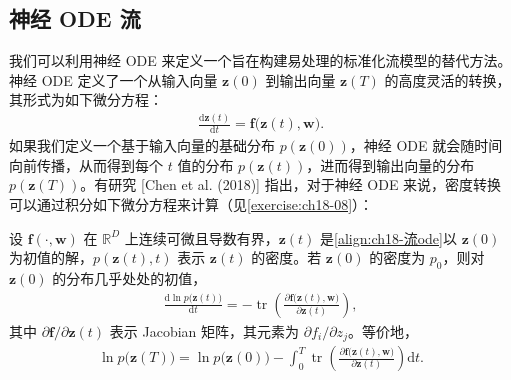\documentclass[../../main.tex]{subfiles}
\begin{document}
\subsection{神经 ODE 流}\label{subsection:ch18-神经ode流}

我们可以利用神经 ODE 来定义一个旨在构建易处理的标准化流模型的替代方法。神经 ODE 定义了一个从输入向量 $\bm{z}(0)$ 到输出向量 $\bm{z}(T)$ 的高度灵活的转换，其形式为如下微分方程：
\begin{align}
  \frac{\mathrm{d}\bm{z}(t)}{\mathrm{d}t}=\bm{f}\big(\bm{z}(t),\bm{w}\big).\label{align:ch18-流ode}
\end{align}
如果我们定义一个基于输入向量的基础分布 $p(\bm{z}(0))$，神经 ODE 就会随时间向前传播，从而得到每个 $t$ 值的分布 $p(\bm{z}(t))$，进而得到输出向量的分布 $p(\bm{z}(T))$。有研究 [Chen et al. (2018)] 指出，对于神经 ODE 来说，密度转换可以通过积分如下微分方程来计算（见\cref{exercise:ch18-08}）：

\begin{theorem}[连续流的瞬时变量替换]\label{theorem:ch18-瞬时变量替换}
设 $\bm{f}(\cdot,\bm{w})$ 在 $\mathbb{R}^{D}$ 上连续可微且导数有界，$\bm{z}(t)$ 是\eqref{align:ch18-流ode}以 $\bm{z}(0)$ 为初值的解，$p(\bm{z}(t),t)$ 表示 $\bm{z}(t)$ 的密度。若 $\bm{z}(0)$ 的密度为 $p_0$，则对 $\bm{z}(0)$ 的分布几乎处处的初值，
\begin{align}
  \frac{\mathrm{d}\ln p\big(\bm{z}(t)\big)}{\mathrm{d}t}=-\operatorname{tr}\left(\frac{\partial\bm{f}\big(\bm{z}(t),\bm{w}\big)}{\partial\bm{z}(t)}\right),\label{align:ch18-瞬时变量替换}
\end{align}
其中 $\partial\bm{f}/\partial\bm{z}(t)$ 表示 Jacobian 矩阵，其元素为 $\partial f_i/\partial z_j$。等价地，
\begin{align*}
  \ln p\big(\bm{z}(T)\big)=\ln p\big(\bm{z}(0)\big)-\int_{0}^{T}\operatorname{tr}\left(\frac{\partial\bm{f}\big(\bm{z}(t),\bm{w}\big)}{\partial\bm{z}(t)}\right)\mathrm{d}t .
\end{align*}
\end{theorem}
\end{document}
